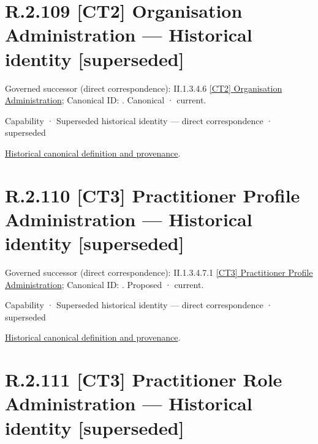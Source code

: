 \section*{R.2.109 [CT2] Organisation Administration — Historical identity [superseded]}
\label{navigation:R.2.109}

{\small Governed successor (direct correspondence): II.1.3.4.6 \hyperref[element:14fbdc5ce3dd4c2092c5397dab3ed743]{[CT2] Organisation Administration}; Canonical ID: \texttt{}. Canonical · current.}\par
\label{element:1b0eacfbb27d4631a24f9279dab6681d}
{\small Capability · Superseded historical identity — direct correspondence · superseded}\par
\href{../../../../../../../continuum/strategy/capability/1b0eacfbb27d4631a24f9279dab6681d.md}{Historical canonical definition and provenance}.\par
\section*{R.2.110 [CT3] Practitioner Profile Administration — Historical identity [superseded]}
\label{navigation:R.2.110}

{\small Governed successor (direct correspondence): II.1.3.4.7.1 \hyperref[element:40759a835f7b456e9257c38b67b0a380]{[CT3] Practitioner Profile Administration}; Canonical ID: \texttt{}. Proposed · current.}\par
\label{element:2415ddcbc73c47e1a63be310bd4342ee}
{\small Capability · Superseded historical identity — direct correspondence · superseded}\par
\href{../../../../../../../continuum/strategy/capability/2415ddcbc73c47e1a63be310bd4342ee.md}{Historical canonical definition and provenance}.\par
\section*{R.2.111 [CT3] Practitioner Role Administration — Historical identity [superseded]}
\label{navigation:R.2.111}

